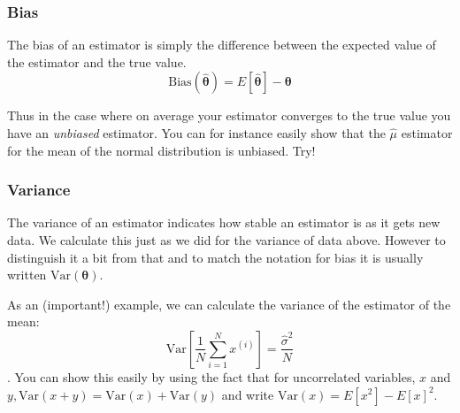 \documentclass[a4paper,10pt]{article}
\begin{document}
\subsubsection{ Bias}

The bias of an estimator is simply the difference between the expected value of the estimator and the true value.
$$\mathrm{Bias}(\hat{\boldsymbol{\theta}}) = E\left[\hat{\boldsymbol{\theta}}\right] - \boldsymbol{\theta} $$

Thus in the case where on average your estimator converges to the true value you have an \textit{unbiased} estimator. You can for instance easily show that the $\hat{\mu}$ estimator for the mean of the normal distribution is unbiased. Try!

\subsubsection{ Variance}

The variance of an estimator indicates how stable an estimator is as it gets new data. We calculate this just as we did for the variance of data above. However to distinguish it a bit from that and to match the notation for bias it is usually written $\mathrm{Var}(\boldsymbol{\theta})$.

As an (important!) example, we can calculate the variance of the estimator of the mean:
$$\mathrm{Var}\left[\frac{1}{N} \sum_{i=1}^N x^{(i)}\right] = \frac{\hat{\sigma}^2}{N}$$.
You can show this easily by using the fact that for uncorrelated variables, $x$ and $y, \mathrm{Var}(x+y) = \mathrm{Var}(x) + \mathrm{Var}(y)$ and write $\mathrm{Var}(x) = E\left[x^2
\right] - E\left[x\right]^2$.
\end{document}
